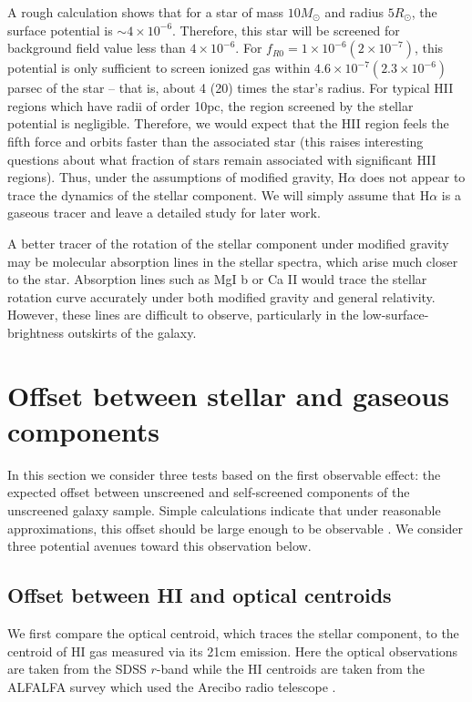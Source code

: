 \documentclass[useAMS,usenatbib,twocolumn]{mn2e}
\newcommand{\ha}{H$\alpha$}
\begin{document}
A rough calculation shows that for a star of mass $10 M_\odot$ and radius
$5 R_\odot$, the surface potential is $\sim 4\times10^{-6}$. Therefore, this
star will be screened for background field value less than $4\times10^{-6}$.
For $f_{R0} = 1\times10^{-6} (2\times10^{-7})$, this potential is only
sufficient
to screen ionized gas within
$4.6\times10^{-7} (2.3\times10^{-6})$ parsec of the star -- that is, about
4 (20) times the star's radius.
For typical HII regions which have radii of order 10pc, the region screened
by the stellar potential is negligible.  Therefore, we would expect  that the
HII region feels the fifth force and 
orbits faster than the associated star (this raises interesting questions about 
what fraction of stars remain associated with significant HII regions). 
Thus, under the assumptions of
modified gravity,  \ha{} does not appear to trace the dynamics of the stellar
component. We will simply assume that \ha{} is a gaseous tracer and leave 
a detailed study for later work. 

A better tracer of the rotation of the stellar component under modified gravity
may be molecular absorption lines in the stellar spectra, which arise much
closer to the star. Absorption lines such as MgI b or Ca II would trace the
stellar rotation curve accurately under both modified gravity and general
relativity. However, these lines are difficult to observe, particularly
in the low-surface-brightness outskirts of the galaxy. 



\section{Offset between stellar and gaseous components}
\label{sec:offset}

In this section we consider three tests based on the first observable effect:
the expected offset between unscreened and self-screened components of the
unscreened galaxy sample. Simple calculations indicate that under
reasonable approximations, this offset should be large enough to be
observable \citep{bhuvjake2011}.  We consider three potential avenues toward
this observation below.

\subsection{Offset between HI and optical centroids}
\label{sec:h1-opt-offset}
We first  compare the optical centroid, which traces
the stellar component, to the centroid of HI gas measured via its 21cm emission. 
Here the optical observations are taken from the SDSS $r$-band \citep{aba09}
while the HI centroids
are taken from the ALFALFA survey which used the Arecibo radio telescope
\citep{giovanelli2005, gio07, sai08,ken08,mar09}.
\end{document}
